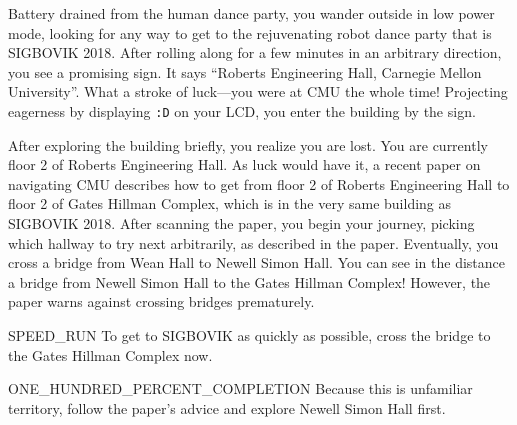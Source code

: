 Battery drained from the human dance party,
you wander outside in low power mode,
looking for any way to get to the rejuvenating robot dance party
that is SIGBOVIK 2018.
After rolling along for a few minutes in an arbitrary direction,
you see a promising sign.
It says ``Roberts Engineering Hall, Carnegie Mellon University''.
What a stroke of luck---you were at CMU the whole time!
Projecting eagerness by displaying \texttt{:D} on your LCD,
you enter the building by the sign.

After exploring the building briefly,
you realize you are lost.
You are currently floor 2 of Roberts Engineering Hall.
As luck would have it, a recent paper on navigating CMU \citep{stefan_ben}
describes how to get from floor 2 of Roberts Engineering Hall
to floor 2 of Gates Hillman Complex,
which is in the very same building as SIGBOVIK 2018.
After scanning the paper, you begin your journey,
picking which hallway to try next arbitrarily, as described in the paper.
Eventually, you cross a bridge from Wean Hall to Newell Simon Hall.
You can see in the distance a bridge from Newell Simon Hall
to the Gates Hillman Complex!
However, the paper warns against crossing bridges prematurely.

\begin{switch}
\item{SPEED\_RUN}
  To get to SIGBOVIK as quickly as possible,
  cross the bridge to the Gates Hillman Complex now.
\item{ONE\_HUNDRED\_PERCENT\_COMPLETION}
  Because this is unfamiliar territory,
  follow the paper's advice and explore Newell Simon Hall first.
\end{switch}


